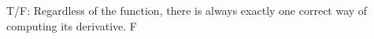 {T/F: Regardless of the function, there is always exactly one correct way of computing its derivative.
}
{F
}
